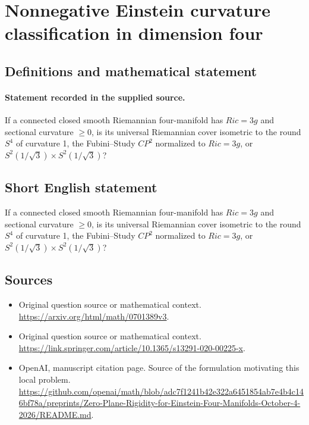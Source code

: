 \documentclass[11pt]{article}
\begin{document}
\section*{Nonnegative Einstein curvature classification in dimension four}\label{statement}
\subsection{Definitions and mathematical statement}
\paragraph{Statement recorded in the supplied source.}
If a connected closed smooth Riemannian four-manifold has $Ric=3g$ and sectional curvature $\geq 0$, is its universal Riemannian cover isometric to the round $S^{4}$ of curvature 1, the Fubini–Study $CP^{2}$ normalized to $Ric=3g$, or $S^{2}(1/\surd 3)×S^{2}(1/\surd 3)$?
\subsection{Short English statement}
If a connected closed smooth Riemannian four-manifold has $Ric=3g$ and sectional curvature $\geq 0$, is its universal Riemannian cover isometric to the round $S^{4}$ of curvature 1, the Fubini–Study $CP^{2}$ normalized to $Ric=3g$, or $S^{2}(1/\surd 3)×S^{2}(1/\surd 3)$?
\subsection{Sources}
\begin{itemize}
\item[S1] Original question source or mathematical context.
\url{https://arxiv.org/html/math/0701389v3}.
\item[S2] Original question source or mathematical context.
\url{https://link.springer.com/article/10.1365/s13291-020-00225-x}.
\item[S3] OpenAI, manuscript citation page. Source of the formulation motivating this local problem.
\url{https://github.com/openai/math/blob/adc7f1241b42e322a6451854ab7e4b4c146bf78a/preprints/Zero-Plane-Rigidity-for-Einstein-Four-Manifolds-October-4-2026/README.md}.
\end{itemize}
\end{document}
